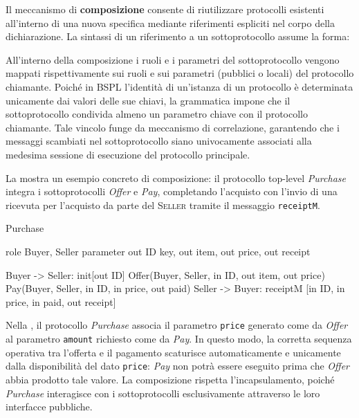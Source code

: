 Il meccanismo di \textbf{composizione} consente di riutilizzare protocolli esistenti all'interno 
di una nuova specifica mediante riferimenti espliciti nel corpo della dichiarazione. 
La sintassi di un riferimento a un sottoprotocollo assume la forma:
\begin{center}
\end{center}

All'interno della composizione i ruoli e i parametri del sottoprotocollo vengono mappati 
rispettivamente sui ruoli e sui parametri (pubblici o locali) del protocollo chiamante.
Poiché in BSPL l'identità di un'istanza di un protocollo è determinata unicamente dai valori delle sue chiavi,
la grammatica impone che il sottoprotocollo condivida almeno un parametro chiave con il protocollo
chiamante. Tale vincolo funge da meccanismo di correlazione, garantendo che i messaggi scambiati
nel sottoprotocollo siano univocamente associati alla medesima sessione di esecuzione del protocollo principale.

La  mostra un esempio concreto di composizione: il protocollo top-level 
\emph{Purchase} integra i sottoprotocolli \emph{Offer} e \emph{Pay}, completando l'acquisto con
l'invio di una ricevuta per l'acquisto da parte del \textsc{Seller} tramite il messaggio \texttt{receiptM}.

\begin{bspllisting}[caption={Dichiarazione del protocollo composito Purchase in BSPL.}, label={lst:bspl_purchase}]
Purchase {
    role Buyer, Seller
    parameter out ID key, out item, out price, out receipt

    Buyer -> Seller: init[out ID]
    Offer(Buyer, Seller, in ID, out item, out price)
    Pay(Buyer, Seller, in ID, in price, out paid)
    Seller -> Buyer: receiptM [in ID, in price, in paid, out receipt]
}
\end{bspllisting}

Nella , il protocollo \emph{Purchase} associa il parametro \texttt{price} 
generato come  da \emph{Offer} al parametro \texttt{amount} 
richiesto come  da \emph{Pay}. 
In questo modo, la corretta sequenza operativa tra l'offerta e il pagamento scaturisce 
automaticamente e unicamente dalla disponibilità del dato \texttt{price}: \emph{Pay} non potrà 
essere eseguito prima che \emph{Offer} abbia prodotto tale valore. La composizione rispetta 
l'incapsulamento, poiché \emph{Purchase} interagisce con i sottoprotocolli esclusivamente attraverso 
le loro interfacce pubbliche.

